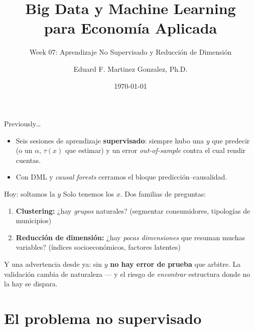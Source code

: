\documentclass{beamer}
\title[BDML]{Big Data y Machine Learning \\ para Economía Aplicada}
\subtitle{Week 07: Aprendizaje No Supervisado y Reducción de Dimensión}
\author{Eduard F. Martinez Gonzalez, Ph.D.}
\institute[]{Departamento de Economía, Universidad Icesi}
\date{\today}
\newcommand{\1}{\mathbb{I}}
\begin{document}
\begin{frame}
\titlepage
\end{frame}

\begin{frame}{Previously\ldots}
\small
\begin{itemize}\itemsep5pt
  \item Seis sesiones de aprendizaje \textbf{supervisado}: siempre hubo una $y$ que predecir (o un $\alpha$, $\tau(x)$ que estimar) y un error \emph{out-of-sample} contra el cual rendir cuentas.
  \item Con DML y \emph{causal forests} cerramos el bloque predicción--causalidad.
\end{itemize}
\pause

\vspace{0.2cm}
\begin{block}{Hoy: soltamos la $y$}
Solo tenemos los $x$. Dos familias de preguntas:
\begin{enumerate}\itemsep2pt
  \item \textbf{Clustering:} ¿hay \emph{grupos} naturales? (segmentar consumidores, tipologías de municipios)
  \item \textbf{Reducción de dimensión:} ¿hay \emph{pocas dimensiones} que resuman muchas variables? (índices socioeconómicos, factores latentes)
\end{enumerate}
\end{block}
\pause

\vspace{0.1cm}
Y una advertencia desde ya: sin $y$ \textbf{no hay error de prueba} que arbitre. La validación cambia de naturaleza --- y el riesgo de \emph{encontrar} estructura donde no la hay se dispara.
\end{frame}


\section{El problema no supervisado}
\begin{frame}[noframenumbering]
\tableofcontents[currentsection]
\end{frame}
\end{document}
